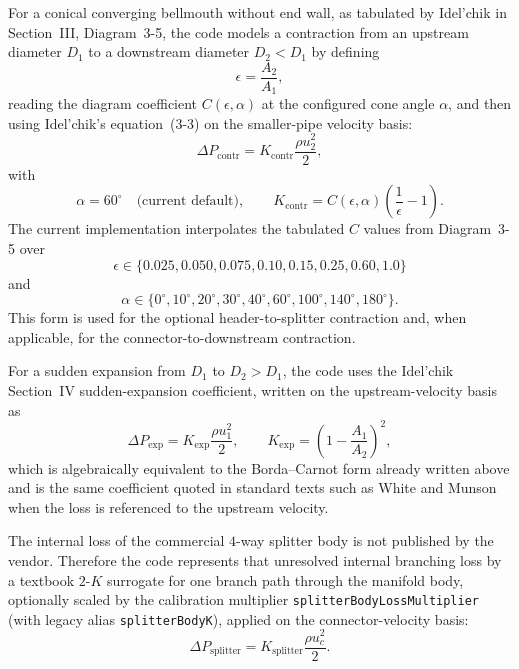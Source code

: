 \documentclass{article}
\begin{document}
For a conical converging bellmouth without end wall, as tabulated by
Idel'chik in Section~III, Diagram~3-5, the code models a contraction from
an upstream diameter $D_1$ to a downstream diameter $D_2 < D_1$ by
defining
\begin{equation}
\epsilon = \frac{A_2}{A_1},
\end{equation}
reading the diagram coefficient $C(\epsilon,\alpha)$ at the configured cone
angle $\alpha$, and then using Idel'chik's equation~(3-3) on the smaller-pipe
velocity basis:
\begin{equation}
\Delta P_{\mathrm{contr}}
= K_{\mathrm{contr}} \frac{\rho u_2^2}{2},
\end{equation}
with
\begin{equation}
\alpha = 60^\circ \quad \text{(current default)},
\qquad
K_{\mathrm{contr}} = C(\epsilon,\alpha)\left(\frac{1}{\epsilon}-1\right).
\end{equation}
The current implementation interpolates the tabulated $C$ values from
Diagram~3-5 over
\begin{equation}
\epsilon \in \{0.025, 0.050, 0.075, 0.10, 0.15, 0.25, 0.60, 1.0\}
\end{equation}
and
\begin{equation}
\alpha \in \{0^\circ, 10^\circ, 20^\circ, 30^\circ, 40^\circ, 60^\circ,
100^\circ, 140^\circ, 180^\circ\}.
\end{equation}
This form is used for the optional header-to-splitter contraction and, when
applicable, for the connector-to-downstream contraction.

For a sudden expansion from $D_1$ to $D_2 > D_1$, the code uses the
Idel'chik Section~IV sudden-expansion coefficient, written on the
upstream-velocity basis as
\begin{equation}
\Delta P_{\mathrm{exp}}
= K_{\mathrm{exp}} \frac{\rho u_1^2}{2},
\qquad
K_{\mathrm{exp}} = \left(1-\frac{A_1}{A_2}\right)^2,
\end{equation}
which is algebraically equivalent to the Borda--Carnot form already written
above and is the same coefficient quoted in standard texts such as White and
Munson when the loss is referenced to the upstream velocity.

The internal loss of the commercial $4$-way splitter body is not published
by the vendor. Therefore the code represents that unresolved internal
branching loss by a textbook \(2\)-\(K\) surrogate for one branch path
through the manifold body, optionally scaled by the calibration multiplier
\texttt{splitterBodyLossMultiplier} (with legacy alias
\texttt{splitterBodyK}), applied on the connector-velocity basis:
\begin{equation}
\Delta P_{\mathrm{splitter}}
= K_{\mathrm{splitter}} \frac{\rho u_c^2}{2}.
\end{equation}
\end{document}
